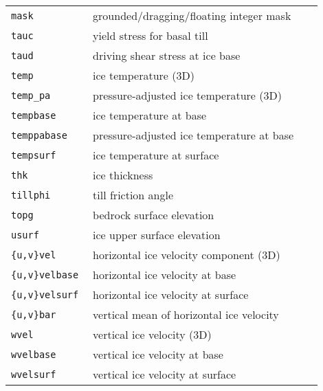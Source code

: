 \documentclass[landscape]{article}
\begin{document}
\begin{textblock}{15}
\begin{tabular}{@{}p{0.2\linewidth}p{0.7\linewidth}@{}}
  \texttt{mask} &  grounded/dragging/floating integer mask \\
  \texttt{tauc} &  yield stress for basal till \\
  \texttt{taud} &  driving shear stress at ice base \\
  \texttt{temp} &  ice temperature (3D) \\
  \texttt{temp_pa} &  pressure-adjusted ice temperature (3D) \\
  \texttt{tempbase} &  ice temperature at base\\
  \texttt{temppabase} &  pressure-adjusted ice temperature at base\\
  \texttt{tempsurf} &  ice temperature at surface\\
  \texttt{thk} &  ice thickness\\
  \texttt{tillphi} &  till friction angle \\
  \texttt{topg} &  bedrock surface elevation \\
  \texttt{usurf} &  ice upper surface elevation \\
  \texttt{\{u,v\}vel} &  horizontal ice velocity component (3D) \\
  \texttt{\{u,v\}velbase} &  horizontal ice velocity at base\\
  \texttt{\{u,v\}velsurf} &  horizontal ice velocity at surface\\
  \texttt{\{u,v\}bar} &  vertical mean of horizontal ice velocity\\
  \texttt{wvel} &  vertical ice velocity (3D) \\
  \texttt{wvelbase} &  vertical ice velocity at base\\
  \texttt{wvelsurf} &  vertical ice velocity at surface\\
  \end{tabular}

\end{textblock}
\end{document}
